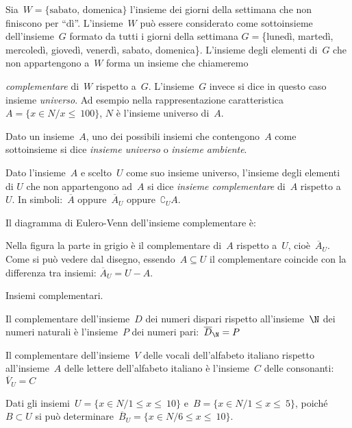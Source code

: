 Sia~\(W=\{\text{sabato, domenica}\}\) l'insieme dei giorni della settimana 
che non finiscono per ``dì''.
L'insieme~\(W\) può essere considerato come sottoinsieme dell'insieme~\(G\) 
formato da tutti i giorni della settimana
\(G=\)\{lunedì, martedì, mercoledì, giovedì, venerdì, sabato, domenica\}.
L'insieme degli elementi di~\(G\) che non appartengono a~\(W\) forma
un insieme che chiameremo {\emph{complementare} di~\(W\) rispetto a~\(G\). 
L'insieme~\(G\) invece si dice in questo caso insieme \emph{universo}. 
Ad esempio nella rappresentazione caratteristica~\(A=\{x\in N/x\le~100\}\),
\(N\) è l'insieme universo di~\(A\).

\begin{definizione}
Dato un insieme~\(A\), uno dei possibili insiemi che
contengono~\(A\) come sottoinsieme si dice
\emph{insieme universo} o \emph{insieme ambiente}.
\end{definizione}

\begin{definizione}
Dato l'insieme~\(A\) e scelto~\(U\) come suo insieme universo, l'insieme 
degli elementi di \(U\) che non appartengono ad~\(A\) si dice 
\emph{insieme complementare} di~\(A\) rispetto a~\(U\). 
In simboli:~\(\overline{A}\) oppure~\(\overline{A}_{U}\) 
oppure~\(\complement_{U}A\).
\end{definizione}

\begin{multicols}{2}
Il diagramma di Eulero-Venn dell'insieme complementare è:
\begin{center}

\end{center}
Nella figura la parte in grigio è il complementare di~\(A\) rispetto 
a~\(U\), cioè~\({\overline{A}}_{U}\).
Come si può vedere dal disegno, essendo~\(A\subseteq U\) il complementare 
coincide con la differenza tra insiemi: \({\overline{A}}_{U}=U-A\).
\end{multicols}

 \begin{esempio}
 Insiemi complementari.
\begin{enumeratea}
\item Il complementare dell'insieme~\(D\) dei numeri dispari rispetto 
all'insieme~\(\N\) dei numeri naturali è
l'insieme~\(P\) dei numeri pari:~\({\overline{D}}_{\N}=P\)
\item Il complementare dell'insieme~\(V\) delle vocali dell'alfabeto 
italiano rispetto all'insieme~\(A\) delle lettere dell'alfabeto italiano è 
l'insieme~\(C\) delle consonanti: \({\overline{V}}_{U}=C\)
\item Dati gli insiemi~\(U=\{x\in N/1\le x\le~10\}\) 
 e~\(B=\{x\in N/1\le x\le~5\}\), poiché \(B\subset U\)
 si può determinare~\({\overline{B}}_{U}=\{x\in N/6\le x\le~10\}\).
\end{enumeratea}
 \end{esempio}

}
